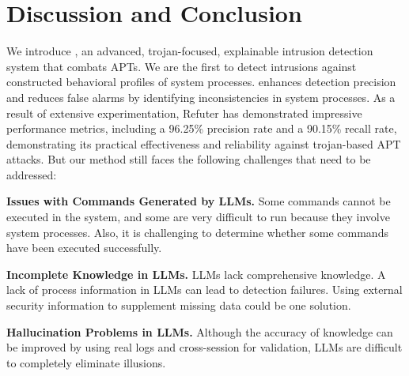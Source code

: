 
\section{Discussion and Conclusion}

We introduce \tool, an advanced, trojan-focused, explainable intrusion detection system that combats APTs. We are the first to detect intrusions against constructed behavioral profiles of system processes. \tool enhances detection precision and reduces false alarms by identifying inconsistencies in system processes. As a result of extensive experimentation, Refuter has demonstrated impressive performance metrics, including a 96.25\% precision rate and a 90.15\% recall rate, demonstrating its practical effectiveness and reliability against trojan-based APT attacks. 
% 
But our method still faces the following challenges that need to be addressed:

\noindent
{\bf Issues with Commands Generated by LLMs.}
Some commands cannot be executed in the system, and some are very difficult to run because they involve system processes. Also, it is challenging to determine whether some commands have been executed successfully.

\noindent
{\bf Incomplete Knowledge in LLMs.}
LLMs lack comprehensive knowledge. A lack of process information in LLMs can lead to detection failures. Using external security information to supplement missing data could be one solution.

\noindent
{\bf Hallucination Problems in LLMs.}
Although the accuracy of knowledge can be improved by using real logs and cross-session for validation, LLMs are difficult to completely eliminate illusions.



